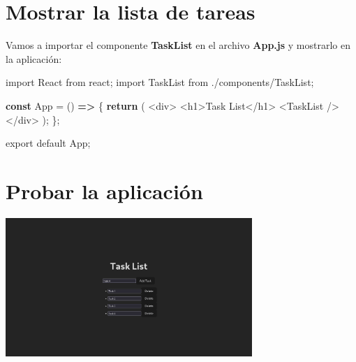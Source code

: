 \documentclass[
  a4paper,
  DIV=11,
  numbers=noendperiod,
  onepage,
  openany]{scrreprt}
\newenvironment{Shaded}{\begin{snugshade}}{\end{snugshade}}
\newcommand{\ControlFlowTok}[1]{\textcolor[rgb]{0.00,0.23,0.31}{\textbf{#1}}}
\newcommand{\ImportTok}[1]{\textcolor[rgb]{0.00,0.46,0.62}{#1}}
\newcommand{\KeywordTok}[1]{\textcolor[rgb]{0.00,0.23,0.31}{\textbf{#1}}}
\newcommand{\NormalTok}[1]{\textcolor[rgb]{0.00,0.23,0.31}{#1}}
\newcommand{\OperatorTok}[1]{\textcolor[rgb]{0.37,0.37,0.37}{#1}}
\newcommand{\StringTok}[1]{\textcolor[rgb]{0.13,0.47,0.30}{#1}}
\begin{document}
\begin{tcolorbox}
\section{Mostrar la lista de tareas}\label{mostrar-la-lista-de-tareas}

Vamos a importar el componente \textbf{TaskList} en el archivo
\textbf{App.js} y mostrarlo en la aplicación:

\begin{Shaded}
\begin{Highlighting}[]
\ImportTok{import}\NormalTok{ React }\ImportTok{from} \StringTok{\textquotesingle{}react\textquotesingle{}}\OperatorTok{;}
\ImportTok{import}\NormalTok{ TaskList }\ImportTok{from} \StringTok{\textquotesingle{}./components/TaskList\textquotesingle{}}\OperatorTok{;}

\KeywordTok{const}\NormalTok{ App }\OperatorTok{=}\NormalTok{ () }\KeywordTok{=\textgreater{}}\NormalTok{ \{}
  \ControlFlowTok{return}\NormalTok{ (}
    \OperatorTok{\textless{}}\NormalTok{div}\OperatorTok{\textgreater{}}
      \OperatorTok{\textless{}}\NormalTok{h1}\OperatorTok{\textgreater{}}\NormalTok{Task List}\OperatorTok{\textless{}/}\NormalTok{h1}\OperatorTok{\textgreater{}}
      \OperatorTok{\textless{}}\NormalTok{TaskList }\OperatorTok{/\textgreater{}}
    \OperatorTok{\textless{}/}\NormalTok{div}\OperatorTok{\textgreater{}}
\NormalTok{  )}\OperatorTok{;}
\NormalTok{\}}\OperatorTok{;}

\ImportTok{export} \ImportTok{default}\NormalTok{ App}\OperatorTok{;}
\end{Highlighting}
\end{Shaded}

\section{Probar la aplicación}\label{probar-la-aplicaciuxf3n}

\includegraphics[width=0.7\textwidth,height=\textheight]{unidades/unidad6/images/paste-3.png}


\end{tcolorbox}
\end{document}
